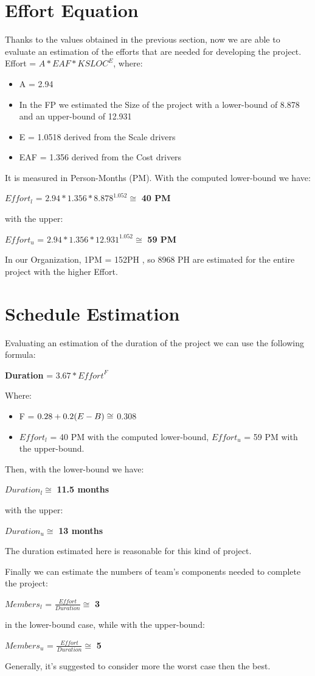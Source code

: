 \section{Effort Equation}
Thanks to the values obtained in the previous section, now we are able to evaluate an estimation of the efforts that are needed for developing the project.  Effort = $A * EAF * KSLOC^E $, where:  
\begin{itemize}
\item A = 2.94 
\item In the FP we estimated the Size of the project with a lower-bound of 8.878 and an upper-bound of 12.931
\item E = 1.0518 derived from the Scale drivers
\item EAF = 1.356 derived from the Cost drivers
\end{itemize}
It is measured in Person-Months (PM).
With the computed lower-bound we have: 
\\\begin{center} $Effort_l$ = $ 2.94 * 1.356 * 8.878^{1.052} \cong$ \textbf{40 PM}\end{center}
with the upper:
\\\begin{center} $Effort_u$ = $2.94 * 1.356 * 12.931^{1.052} \cong$ \textbf{59 PM} \end{center}

In our Organization, 1PM = 152PH , so 8968 PH are estimated for the entire project with the higher Effort.

\section{Schedule Estimation}
Evaluating an estimation of the duration of the project we can use the following formula:
\begin{center}\textbf{Duration} = $3.67 * \textit{Effort}^F$  \end{center}
Where:
\begin{itemize}
\item F = $0.28 + 0.2 \* (E - B) \cong$  0.308
\item $Effort_l$ = 40 PM with the computed lower-bound, $Effort_u$ = 59 PM with the upper-bound.
\end{itemize}
Then, with the lower-bound we have: 
\begin{center}$Duration_l \cong$ \textbf{11.5 months} \end{center}
with the upper:
\begin{center}$Duration_u \cong$ \textbf{13 months} \end{center}
The duration estimated here is reasonable for this kind of project.

Finally we can estimate the numbers of team's components needed to complete the project:
\begin{center}\textbf{$Members_l$} = $\frac{Effort}{Duration} \cong$ \textbf{3}\end{center}
in the lower-bound case, while with the upper-bound:
\begin{center}\textbf{$Members_u$} = $\frac{Effort}{Duration} \cong$ \textbf{5}\end{center}
Generally, it's suggested to consider more the worst case then the best.
